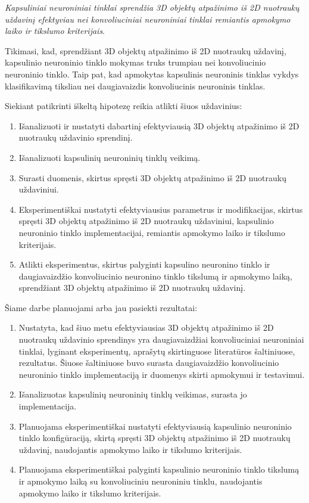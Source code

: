 \textit{Kapsuliniai neuroniniai tinklai sprendžia 3D objektų atpažinimo iš 2D nuotraukų uždavinį efektyviau nei konvoliuciniai neuroniniai tinklai remiantis apmokymo laiko ir tikslumo kriterijais}.

Tikimasi, kad, sprendžiant 3D objektų atpažinimo iš 2D nuotraukų uždavinį, kapsulinio neuroninio tinklo mokymas truks trumpiau nei konvoliucinio neuroninio tinklo. Taip pat, kad apmokytas kapsulinis neuroninis tinklas vykdys klasifikavimą tiksliau nei daugiavaizdis konvoliucinis neuroninis tinklas.

Siekiant patikrinti iškeltą hipotezę reikia atlikti šiuos uždavinius:

\begin{enumerate}
	\item Išanalizuoti ir nustatyti dabartinį efektyviausią 3D objektų atpažinimo iš 2D nuotraukų uždavinio sprendinį.
	\item Išanalizuoti kapsulinių neuroninių tinklų veikimą.
	\item Surasti duomenis, skirtus spręsti 3D objektų atpažinimo iš 2D nuotraukų uždaviniui.
	\item Eksperimentiškai nustatyti efektyviausius parametrus ir modifikacijas, skirtus spręsti 3D objektų atpažinimo iš 2D nuotraukų uždaviniui, kapsulinio neuroninio tinklo implementacijai, remiantis apmokymo laiko ir tikslumo kriterijais.
	\item Atlikti eksperimentus, skirtus palyginti kapsulino neuronino tinklo ir daugiavaizdžio konvoliucinio neuronino tinklo tikslumą ir apmokymo laiką, sprendžiant 3D objektų atpažinimo iš 2D nuotraukų uždavinį.
\end{enumerate}

Šiame darbe planuojami arba jau pasiekti rezultatai:

\begin{enumerate}
	\item Nustatyta, kad šiuo metu efektyviausias 3D objektų atpažinimo iš 2D nuotraukų uždavinio sprendinys yra daugiavaizdžiai konvoliuciniai neuroniniai tinklai, lyginant eksperimentų, aprašytų skirtinguose literatūros šaltiniuose, rezultatus. Šiuose šaltiniuose buvo surasta daugiavaizdžio konvoliucinio neuroninio tinklo implementaciją ir duomenys skirti apmokymui ir testavimui.
	\item Išanalizuotas kapsulinių neuroninių tinklų veikimas, surasta jo implementacija.
	\item Planuojama eksperimentiškai nustatyti efektyviausią kapsulinio neuroninio tinklo konfigūraciją, skirtą spręsti 3D objektų atpažinimo iš 2D nuotraukų uždavinį, naudojantis apmokymo laiko ir tikslumo kriterijais.
	\item Planuojama eksperimentiškai palyginti kapsulinio neuroninio tinklo tikslumą ir apmokymo laiką su konvoliuciniu neuroniniu tinklu, naudojantis apmokymo laiko ir tikslumo kriterijais.
\end{enumerate}

